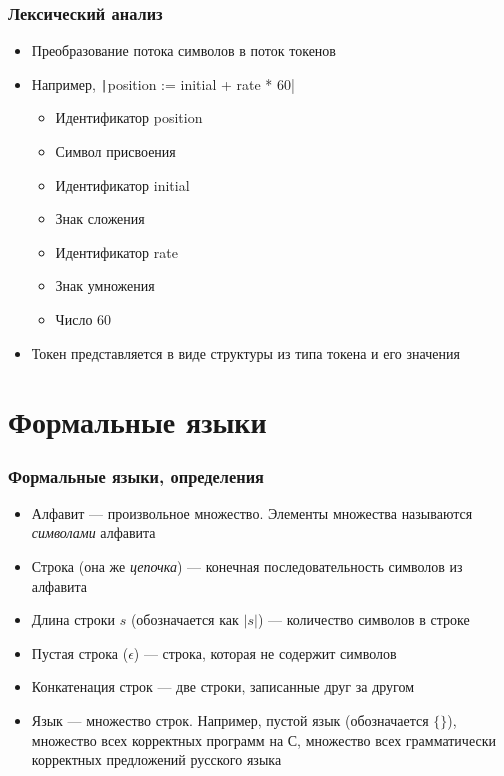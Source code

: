 \documentclass[xetex,mathserif,serif]{beamer}
\begin{document}
    \begin{frame}
        \frametitle{Лексический анализ}
        \begin{itemize}
            \item Преобразование потока символов в поток токенов
            \item Например, \texttt|position := initial + rate * 60|
            \begin{itemize}
                \item Идентификатор position
                \item Символ присвоения
                \item Идентификатор initial
                \item Знак сложения
                \item Идентификатор rate
                \item Знак умножения
                \item Число 60
            \end{itemize}
            \item Токен представляется в виде структуры из типа токена и его значения
        \end{itemize}
    \end{frame}

    \section{Формальные языки}

    \begin{frame}
        \frametitle{Формальные языки, определения}
        \begin{itemize}
            \item Алфавит --- произвольное множество. Элементы множества называются \textit{символами} алфавита
            \item Строка (она же \textit{цепочка}) --- конечная последовательность символов из алфавита
            \item Длина строки $s$ (обозначается как $\lvert{s}\rvert$) --- количество символов в строке
            \item Пустая строка ($\epsilon$) --- строка, которая не содержит символов
            \item Конкатенация строк --- две строки, записанные друг за другом
            \item Язык --- множество строк. Например, пустой язык (обозначается $\{\}$), множество всех корректных 
                программ на С, множество всех грамматически корректных предложений русского языка
        \end{itemize}
    \end{frame}
\end{document}
